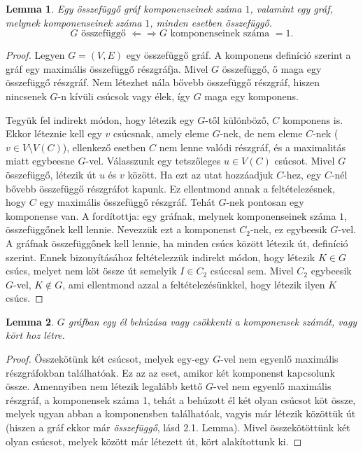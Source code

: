 \documentclass{article}
\newtheorem{lemma}{Lemma}[section]
\begin{document}
\begin{lemma}
    Egy összefüggő gráf komponenseinek száma $1$, valamint egy gráf, melynek komponenseinek száma $1$, minden esetben összefüggő.
    \[
    G \text{ összefüggő } \Leftarrow\Rightarrow G \text{ komponenseinek száma } = 1.
    \]
\end{lemma}
\begin{proof}
    Legyen $G = (V, E)$ egy összefüggő gráf. A komponens definíció szerint a gráf egy maximális összefüggő részgráfja. Mivel $G$ összefüggő, ő maga egy összefüggő részgráf. Nem létezhet nála bővebb összefüggő részgráf, hiszen nincsenek $G$-n kívüli csúcsok vagy élek, így $G$ maga egy komponens.

    Tegyük fel indirekt módon, hogy létezik egy $G$-től különböző, $C$ komponens is. Ekkor léteznie kell egy $v$ csúcsnak, amely eleme $G$-nek, de nem eleme $C$-nek ($v \in V \setminus V(C)$), ellenkező esetben $C$ nem lenne valódi részgráf, és a maximalitás miatt egybeesne $G$-vel. Válasszunk egy tetszőleges $u \in V(C)$ csúcsot. Mivel $G$ összefüggő, létezik út $u$ és $v$ között. Ha ezt az utat hozzáadjuk $C$-hez, egy $C$-nél bővebb összefüggő részgráfot kapunk. Ez ellentmond annak a feltételezésnek, hogy $C$ egy maximális összefüggő részgráf. Tehát $G$-nek pontosan egy komponense van. A fordítottja: egy gráfnak, melynek komponenseinek száma $1$, összefüggőnek kell lennie. Nevezzük ezt a komponenst $C_2$-nek, ez egybeesik $G$-vel. A gráfnak összefüggőnek kell lennie, ha minden csúcs között létezik út, definíció szerint. Ennek bizonyításához feltételezzük indirekt módon, hogy létezik $K \in G$ csúcs, melyet nem köt össze út semelyik $I \in C_2$ csúccsal sem. Mivel $C_2$ egybeesik $G$-vel, $K \notin G$, ami ellentmond azzal a feltételezésünkkel, hogy létezik ilyen $K$ csúcs.
\end{proof}

\begin{lemma}
    $G$ gráfban egy él behúzása vagy csökkenti a komponensek számát, vagy kört hoz létre. 
\end{lemma}
\begin{proof}
    Összekötünk két csúcsot, melyek egy-egy $G$-vel nem egyenlő maximális részgráfokban találhatóak. Ez az az eset, amikor két komponenst kapcsolunk össze. Amennyiben nem létezik legalább kettő $G$-vel nem egyenlő maximális részgráf, a komponensek száma 1, tehát a behúzott él két olyan csúcsot köt össze, melyek ugyan abban a komponensben találhatóak, vagyis már létezik közöttük út (hiszen a gráf ekkor már \emph{összefüggő}, lásd 2.1. Lemma). Mivel összekötöttünk két olyan csúcsot, melyek között már létezett út, kört alakítottunk ki.
\end{proof}
\end{document}
